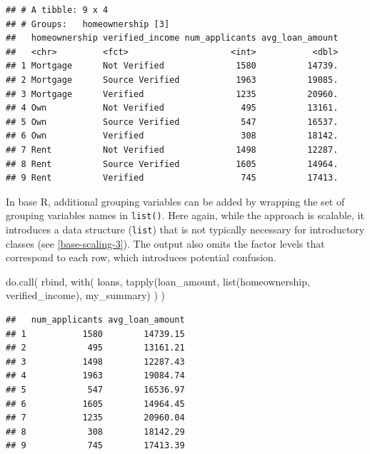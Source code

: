\documentclass[12pt]{article}
\newenvironment{Shaded}{\begin{snugshade}}{\end{snugshade}}
\newcommand{\FunctionTok}[1]{\textcolor[rgb]{0.00,0.00,0.00}{#1}}
\newcommand{\NormalTok}[1]{#1}
\begin{document}
\begin{verbatim}
## # A tibble: 9 x 4
## # Groups:   homeownership [3]
##   homeownership verified_income num_applicants avg_loan_amount
##   <chr>         <fct>                    <int>           <dbl>
## 1 Mortgage      Not Verified              1580          14739.
## 2 Mortgage      Source Verified           1963          19085.
## 3 Mortgage      Verified                  1235          20960.
## 4 Own           Not Verified               495          13161.
## 5 Own           Source Verified            547          16537.
## 6 Own           Verified                   308          18142.
## 7 Rent          Not Verified              1498          12287.
## 8 Rent          Source Verified           1605          14964.
## 9 Rent          Verified                   745          17413.
\end{verbatim}


\label{tidy-scaling-2} \linespread{2}
\vspace{3mm}\setlength{\parindent}{15pt}

In base R, additional grouping variables can be added by wrapping the
set of grouping variables names in \texttt{list()}. Here again, while
the approach is scalable, it introduces a data structure (\texttt{list})
that is not typically necessary for introductory classes (see
\ref{base-scaling-3}). The output also omits the factor levels that
correspond to each row, which introduces potential confusion.

\linespread{1}

\begin{Shaded}
\begin{Highlighting}[]
\FunctionTok{do.call}\NormalTok{(}
\NormalTok{  rbind, }
  \FunctionTok{with}\NormalTok{(}
\NormalTok{    loans, }
    \FunctionTok{tapply}\NormalTok{(loan\_amount, }\FunctionTok{list}\NormalTok{(homeownership, verified\_income), my\_summary)}
\NormalTok{  )}
\NormalTok{)}
\end{Highlighting}
\end{Shaded}

\begin{verbatim}
##   num_applicants avg_loan_amount
## 1           1580        14739.15
## 2            495        13161.21
## 3           1498        12287.43
## 4           1963        19084.74
## 5            547        16536.97
## 6           1605        14964.45
## 7           1235        20960.04
## 8            308        18142.29
## 9            745        17413.39
\end{verbatim}
\end{document}
